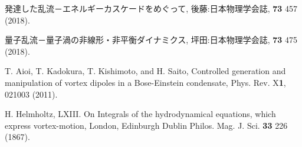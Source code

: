 \documentclass[12pt,a4paper]{jbook}
\begin{document}
\begin{thebibliography}{99}
		発達した乱流－エネルギーカスケードをめぐって,
		後藤:日本物理学会誌, {\bf 73} 457 (2018).

		量子乱流－量子渦の非線形・非平衡ダイナミクス,
		坪田:日本物理学会誌, {\bf 73} 475 (2018).


		T. Aioi, T. Kadokura, T. Kishimoto, and H. Saito,
		Controlled generation and manipulation of vortex dipoles in a Bose-Einstein condensate, 
		Phys. Rev. X{\bf 1}, 021003 (2011).

        H. Helmholtz,
        LXIII. On Integrals of the hydrodynamical equations, 
        which express vortex-motion,
        London, Edinburgh Dublin Philos. Mag. J. Sci. {\bf 33} 226 (1867).

\end{thebibliography}
\end{document}
